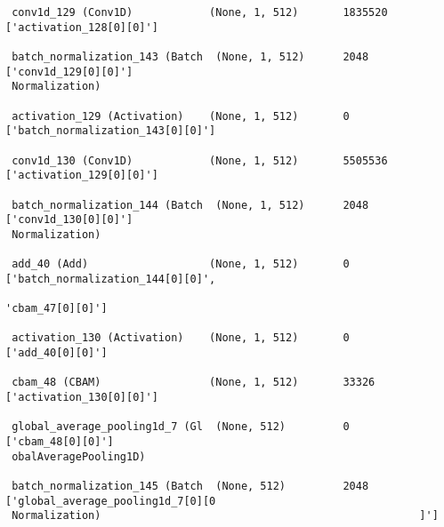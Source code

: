 \begin{lstlisting}
 conv1d_129 (Conv1D)            (None, 1, 512)       1835520     ['activation_128[0][0]']         
                                                                                                  
 batch_normalization_143 (Batch  (None, 1, 512)      2048        ['conv1d_129[0][0]']             
 Normalization)                                                                                   
                                                                                                  
 activation_129 (Activation)    (None, 1, 512)       0           ['batch_normalization_143[0][0]']
                                                                                                  
 conv1d_130 (Conv1D)            (None, 1, 512)       5505536     ['activation_129[0][0]']         
                                                                                                  
 batch_normalization_144 (Batch  (None, 1, 512)      2048        ['conv1d_130[0][0]']             
 Normalization)                                                                                   
                                                                                                  
 add_40 (Add)                   (None, 1, 512)       0           ['batch_normalization_144[0][0]',
                                                                  'cbam_47[0][0]']                
                                                                                                  
 activation_130 (Activation)    (None, 1, 512)       0           ['add_40[0][0]']                 
                                                                                                  
 cbam_48 (CBAM)                 (None, 1, 512)       33326       ['activation_130[0][0]']         
                                                                                                  
 global_average_pooling1d_7 (Gl  (None, 512)         0           ['cbam_48[0][0]']                
 obalAveragePooling1D)                                                                            
                                                                                                  
 batch_normalization_145 (Batch  (None, 512)         2048        ['global_average_pooling1d_7[0][0
 Normalization)                                                  ]']                              
                                                                                                  

\end{lstlisting}
